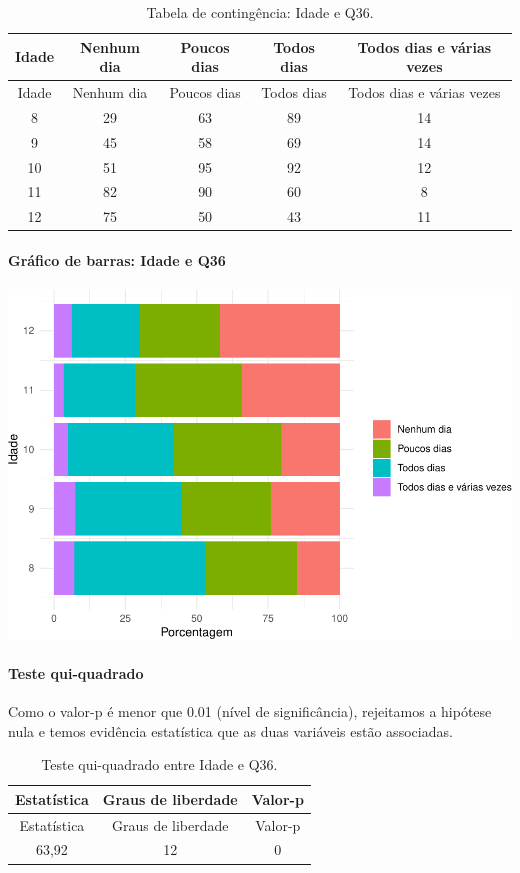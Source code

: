 \documentclass[]{article}
\let\oldparagraph\paragraph
\renewcommand{\paragraph}[1]{\oldparagraph{#1}\mbox{}}
\begin{document}
\begin{longtable}[]{@{}ccccc@{}}
\caption{\label{tab:unnamed-chunk-1330}Tabela de contingência: Idade e Q36.}\tabularnewline
\toprule
Idade & Nenhum dia & Poucos dias & Todos dias & Todos dias e várias vezes\tabularnewline
\midrule
\endfirsthead
\toprule
Idade & Nenhum dia & Poucos dias & Todos dias & Todos dias e várias vezes\tabularnewline
\midrule
\endhead
8 & 29 & 63 & 89 & 14\tabularnewline
9 & 45 & 58 & 69 & 14\tabularnewline
10 & 51 & 95 & 92 & 12\tabularnewline
11 & 82 & 90 & 60 & 8\tabularnewline
12 & 75 & 50 & 43 & 11\tabularnewline
\bottomrule
\end{longtable}

\hypertarget{gruxe1fico-de-barras-idade-e-q36}{%
\paragraph{Gráfico de barras: Idade e Q36}\label{gruxe1fico-de-barras-idade-e-q36}}

\begin{center}\includegraphics[width=0.75\linewidth]{relatorio_covid19_files/figure-latex/unnamed-chunk-1331-1} \end{center}

\hypertarget{teste-qui-quadrado-114}{%
\paragraph{Teste qui-quadrado}\label{teste-qui-quadrado-114}}

Como o valor-p é menor que 0.01 (nível de significância), rejeitamos a hipótese nula e temos evidência estatística que as duas variáveis estão associadas.

\begin{longtable}[]{@{}ccc@{}}
\caption{\label{tab:unnamed-chunk-1333}Teste qui-quadrado entre Idade e Q36.}\tabularnewline
\toprule
Estatística & Graus de liberdade & Valor-p\tabularnewline
\midrule
\endfirsthead
\toprule
Estatística & Graus de liberdade & Valor-p\tabularnewline
\midrule
\endhead
63,92 & 12 & 0\tabularnewline
\bottomrule
\end{longtable}
\end{document}
